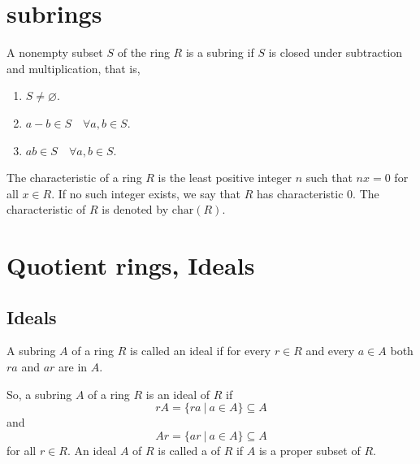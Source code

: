 \section{subrings}

\begin{theorem}
    A nonempty subset $S$ of the ring $R$ is a subring if $S$ is closed under subtraction and multiplication, that is,
    \begin{enumerate}
        \item $S \neq \varnothing$.
        \item $a - b \in S \quad \forall a, b \in S$.
        \item $ab \in S \quad \forall a, b \in S$.
    \end{enumerate}
\end{theorem}

\begin{definition}
    The characteristic of a ring $R$ is the least positive integer $n$ such that $nx = 0$ for all $x \in R$. If no such integer exists, we say that 
    $R$ has characteristic 0. The characteristic of $R$ is denoted by $\text{char}(R)$.
\end{definition}

\section{Quotient rings, Ideals}

\subsection{Ideals}

\begin{definition}[Ideals]
    A subring $A$ of a ring $R$ is called an ideal if for every $r \in R$ and every $a \in A$ both $ra$ and 
    $ar$ are in $A$.
\end{definition}

So, a subring $A$ of a ring $R$ is an ideal of $R$ if 
\[
   rA = \{ ra \> | \> a \in A \} \subseteq A
\]
and 
\[
    Ar = \{ ar \> | \> a \in A \} \subseteq A
\]
for all $r \in R$. An ideal $A$ of $R$ is called a  of $R$ if $A$ is a proper subset of $R$.

